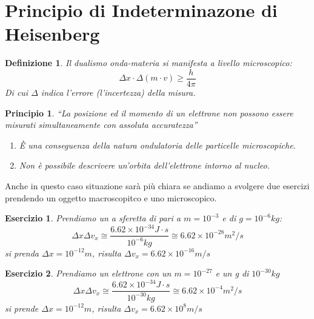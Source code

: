 \documentclass{book}
\newtheorem{defi}{Definizione}[section]
\newtheorem{ess}{Esercizio}[section]
\newtheorem{prin}{Principio}[section]
\begin{document}
\section{Principio di Indeterminazone di Heisenberg}
\label{sec:heisenberg}
\begin{defi}
  Il dualismo onda-materia si manifesta a livello microscopico:
  \begin{equation}
    \label{eq:dualismoondamateria}
    \Delta x \cdot \Delta (m\cdot v)\geq \frac{h}{4\pi}
  \end{equation}
  Di cui $\Delta$ indica l'errore (l'incertezza) della misura.
\end{defi}
\begin{prin}
  ``La posizione ed il momento  di un elettrone non possono essere misurati {\color{red}simultaneamente}
  con assoluta accuratezza''
  \begin{enumerate}
  \item È una conseguenza della natura ondulatoria delle particelle microscopiche.
  \item Non è possibile descrivere un'orbita dell'elettrone intorno al nucleo.
  \end{enumerate}
\end{prin}
Anche in questo caso situazione sarà più chiara se andiamo a svolgere due esercizi prendendo un oggetto macroscopitco
e uno microscopico.
\begin{ess}
  Prendiamo un a sferetta di pari a $m=10^{-3}$ e di $g=10^{-6}kg$:
  \begin{equation*}
    \Delta x \Delta v_x \cong \frac{6.62\times 10^{-34}J\cdot s}{10^{-6}kg}\cong 6.62\times 10^{-28}m^2/s
  \end{equation*}
  si prenda $\Delta x = 10^{-12}m$, risulta $\Delta v_x= 6.62\times 10^{-16}m/s$
\end{ess}
\begin{ess}
  Prendiamo un elettrone con un $m=10^{-27}$ e un g di $10^{-30}kg$
  \begin{equation*}
    \Delta x \Delta v_x\cong \frac{6.62\times 10^{-34}J\cdot s}{10^{-30}kg}\cong 6.62\times 10^{-4}m^2/s
  \end{equation*}
  si prende $\Delta x = 10^{-12}m$, risulta $\Delta v_x= 6.62\times 10^8m/s$
\end{ess}
\end{document}
